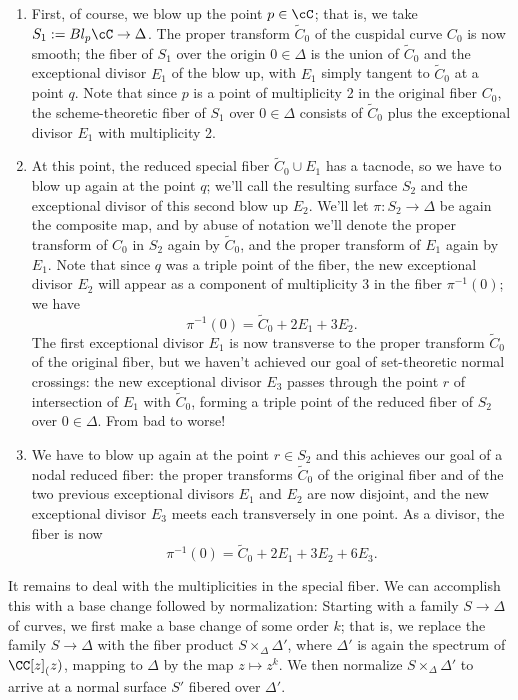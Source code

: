 \begin{enumerate}

\item First, of course, we blow up the point $p \in \cC$; that is, we take $S_1 := Bl_p\cC \to \Delta$. The proper transform $\tilde C_0$ of the cuspidal curve $C_0$ is now smooth; the fiber of $S_1$ over the origin $0 \in \Delta$ is the union of $\tilde C_0$ and the exceptional divisor $E_1$ of the blow up, with $E_1$ simply tangent to $
\tilde C_0$ at a point $q$. Note that since $p$ is a point of multiplicity 2 in the original fiber $C_0$,  the scheme-theoretic fiber of $S_1$ over $0 \in \Delta$ consists of $\tilde C_0$ plus the exceptional divisor $E_1$ with multiplicity 2.

\item At this point, the reduced special fiber $\tilde C_0 \cup E_1$ has a tacnode, so we have to blow up again at the point $q$; we'll call the resulting surface $S_2$ and the exceptional divisor of this second blow up $E_2$. We'll let $\pi : S_2 \to \Delta$ be again the composite map, and by abuse of notation we'll denote the proper transform of $C_0$ in $S_2$ again by $\tilde C_0$, and the proper transform of $E_1$ again by $E_1$. Note that since $q$ was a triple point of the fiber, the new exceptional divisor $E_2$ will appear as a component of multiplicity 3 in the fiber $\pi^{-1}(0)$; we have
$$
\pi^{-1}(0) = \tilde C_0 + 2E_1 + 3E_2.
$$
The first exceptional divisor $E_1$ is now transverse to the proper transform $\tilde C_0$ of the original fiber, but we haven't achieved our goal of set-theoretic normal crossings: the new exceptional divisor $E_3$ passes through the point $r$ of intersection of $E_1$ with $\tilde C_0$, forming a triple point of the reduced fiber of $S_2$ over $0 \in \Delta$. From bad to worse!

\item We have to blow up again at the point $r \in S_2$ and this achieves our goal of a nodal reduced fiber: the proper transforms $\tilde C_0$ of the original fiber and of the two previous exceptional divisors $E_1$ and $E_2$ are now disjoint, and the new exceptional divisor $E_3$ meets each transversely in one point. As a divisor, the fiber is now
$$
\pi^{-1}(0) = \tilde C_0 + 2E_1 + 3E_2 + 6E_3.
$$
\end{enumerate}

It remains to deal with the multiplicities in the special fiber. We can accomplish this with a base change followed by normalization: Starting with a family $S \to \Delta$ of curves, we first make a base change of some order $k$; that is, we replace the family $S \to \Delta$ with the fiber product $S \times_\Delta \Delta'$, where $\Delta'$ is again the spectrum of $\CC[z]_(z)$, mapping to $\Delta$ by the map $z \mapsto z^k$. We then normalize $S \times_\Delta \Delta'$ to arrive at a normal surface $S'$ fibered over $\Delta'$.

